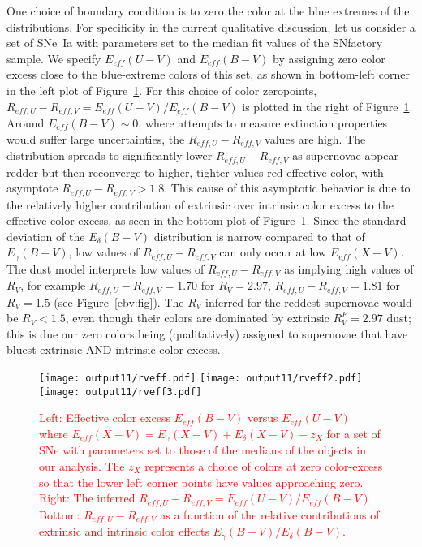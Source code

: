 \documentclass{aastex61}   	%
\begin{document}
One choice of boundary condition is to zero the color at the blue extremes of the distributions.
For specificity in the current qualitative discussion, 
let us consider a set of SNe~Ia  with parameters set to the median fit values of the SNfactory sample.
We specify   $E_{eff}(U-V)$  and $E_{eff}(B-V)$ by
assigning zero color excess close to the blue-extreme colors of this set, 
as shown in bottom-left corner in the left plot of Figure~\ref{rveff:fig}.
For this choice of color zeropoints,
$R_{eff,U} - R_{eff,V} = E_{eff}(U-V) /E_{eff}(B-V)$ is plotted
in the right of Figure~\ref{rveff:fig}.
Around $E_{eff}(B-V) \sim 0$, where attempts to measure extinction properties would suffer large uncertainties,
the $R_{eff,U} - R_{eff,V}$ values are high.
The distribution spreads to significantly 
lower   $R_{eff,U} - R_{eff,V}$ as supernovae appear redder but
then reconverge to higher, tighter values red effective color, with asymptote  $R_{eff,U} - R_{eff,V} >1.8$.
This cause of this asymptotic behavior is due to the relatively higher contribution of extrinsic over intrinsic color excess to the effective color excess, as
seen in the bottom plot of
Figure~\ref{rveff:fig}. 
Since the standard deviation of the $E_\delta(B-V)$ distribution is  narrow compared to that of
 $E_\gamma(B-V)$, low values of $R_{eff,U} - R_{eff,V}$ can only occur
at low $E_{eff}(X-V)$.
 The  \citet{1999PASP..111...63F} dust model interprets
 low values of $R_{eff,U} - R_{eff,V}$ as implying high values of $R_V$,
for example $R_{eff,U} - R_{eff,V}=1.70$ for $R_V=2.97$,  $R_{eff,U} - R_{eff,V}=1.81$ for $R_V=1.5$ (see Figure~\ref{ebv:fig}).
The $R_V$ inferred for the reddest supernovae would be $R_V<1.5$, even though their colors are dominated by 
extrinsic $R^F_V=2.97$ dust; this is due our zero colors being (qualitatively) assigned to supernovae that have bluest extrinsic AND intrinsic color excess.
\begin{figure}[htbp] %
   \centering
   \texttt{[image: output11/rveff.pdf]}
   \texttt{[image: output11/rveff2.pdf]}
   \texttt{[image: output11/rveff3.pdf]}
      \caption{\textcolor{red}{Left: Effective color excess $E_{eff}(B-V)$ versus $E_{eff}(U-V)$
   where $E_{eff}(X-V)   = E_\gamma(X-V) + E_\delta(X-V) - z_X$
   for a set of SNe with parameters set to those of the medians of the objects in our analysis.
   The $z_X$ represents a choice of colors at zero color-excess so that the lower left corner points have values approaching zero. 
Right:  The inferred $R_{eff,U}- R_{eff,V} = E_{eff}(U-V)/E_{eff}(B-V)$.
Bottom:  $R_{eff,U}- R_{eff,V}$ as a function of the relative contributions of extrinsic and intrinsic color effects $E_\gamma(B-V)/E_\delta(B-V)$.}
   \label{rveff:fig}}
\end{figure}
\end{document}
